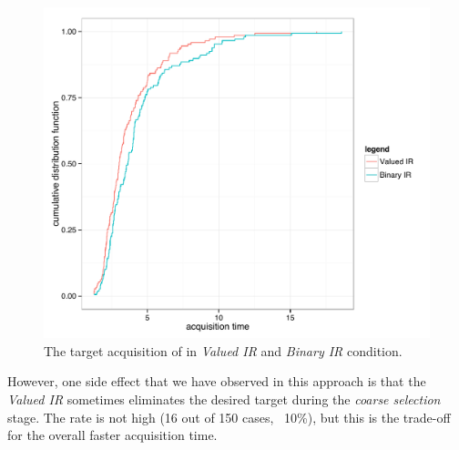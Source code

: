 \begin{figure}[t]
\centering
\includegraphics[width=0.9\columnwidth]{figures/study2_time.pdf}
\caption{The target acquisition of in {\em Valued IR} and {\em Binary IR} condition.}
\label{fig:study2}
\end{figure}

However, one side effect that we have observed in this approach is that the {\em Valued IR} sometimes eliminates the desired target during the {\em coarse selection} stage. The rate is not high (16 out of 150 cases, ~10\%), but this is the trade-off for the overall faster acquisition time.

